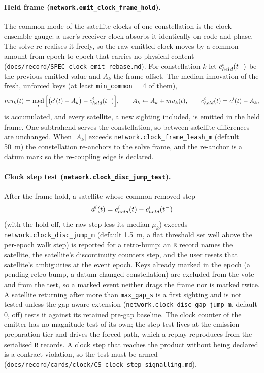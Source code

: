 \documentclass[main.tex]{subfiles}
\begin{document}
\paragraph{Held frame (\texttt{network.emit\_clock\_frame\_hold}).}
The common mode of the satellite clocks of one constellation is the
clock-ensemble gauge: a user's receiver clock absorbs it identically on
code and phase. The solve re-realises it freely, so the raw emitted clock
moves by a common amount from epoch to epoch that carries no physical
content (\texttt{docs/record/SPEC\_clock\_emit\_rebase.md}). For constellation $k$ let
$c^i_{held}(t^-)$ be the previous emitted value and $A_k$ the
frame offset. The median innovation of the fresh, unforced keys (at least
\texttt{min\_common} = 4 of them),
\begin{equation}
mu_k(t) = \operatorname*{med}_{i}\Big[\big(c^i(t) - A_k\big) - c^i_{held}(t^-)\Big],
\qquad
A_k \leftarrow A_k + mu_k(t),
\qquad
c^i_{held}(t) = c^i(t) - A_k,
\label{eq:wire-frameheld}
\end{equation}
is accumulated, and every satellite, a new sighting included, is emitted in
the held frame. One subtrahend serves the constellation, so between-satellite
differences are unchanged. When $|A_k|$ exceeds
\texttt{network.clock\_frame\_leash\_m} (default \SI{50}{\metre}) the
constellation re-anchors to the solve frame, and the re-anchor is a datum
mark so the re-coupling edge is declared.

\paragraph{Clock step test (\texttt{network.clock\_disc\_jump\_test}).}
After the frame hold, a satellite whose common-removed step
\begin{equation}
d^i(t) = c^i_{held}(t) - c^i_{held}(t^-)
\label{eq:wire-clockstep}
\end{equation}
(with the hold off, the raw step less its median $\mu_k$)
exceeds \texttt{network.clock\_disc\_jump\_m} (default \SI{1.5}{\metre}, a flat
threshold set well above the per-epoch walk step) is reported for a
retro-bump: an \texttt{R} record names the satellite, the satellite's
discontinuity counters step, and the user resets that satellite's
ambiguities at the event epoch. Keys already marked in the epoch (a pending
retro-bump, a datum-changed constellation) are excluded from the vote and
from the test, so a marked event neither drags the frame nor is marked
twice. A satellite returning after more than \texttt{max\_gap\_s} is a first
sighting and is not tested unless the gap-aware extension
(\texttt{network.clock\_disc\_gap\_jump\_m}, default 0, off) tests it against
its retained pre-gap baseline. The clock counter of the emitter has no
magnitude test of its own; the step test lives at the emission-preparation
tier and drives the forced path, which a replay reproduces from the
serialised \texttt{R} records. A clock step that reaches the product without
being declared is a contract violation, so the test must be armed
(\texttt{docs/record/cards/clock/CS-clock-step-signalling.md}).
\end{document}
